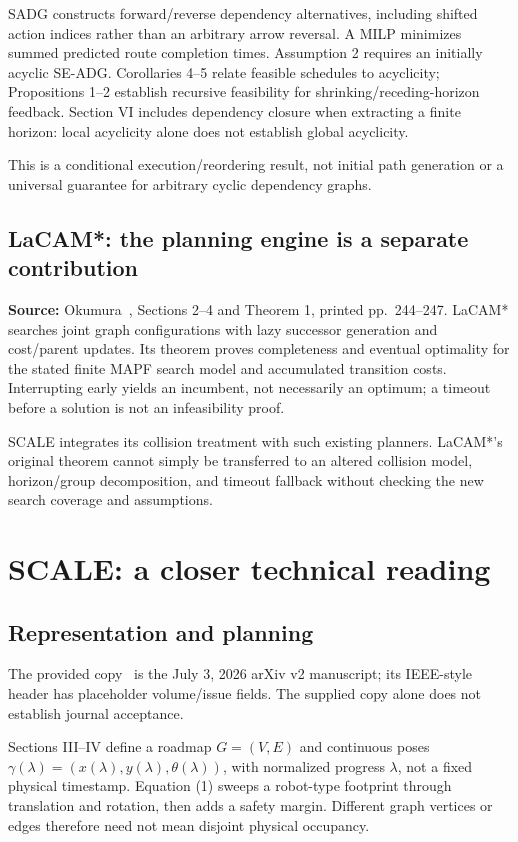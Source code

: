 \documentclass[11pt,a4paper]{article}
\begin{document}
SADG constructs forward/reverse dependency alternatives, including shifted action
indices rather than an arbitrary arrow reversal. A MILP minimizes summed predicted
route completion times. Assumption 2 requires an initially acyclic SE-ADG.
Corollaries 4--5 relate feasible schedules to acyclicity; Propositions 1--2
establish recursive feasibility for shrinking/receding-horizon feedback.
Section VI includes dependency closure when extracting a finite horizon: local
acyclicity alone does not establish global acyclicity.

This is a conditional execution/reordering result, not initial path generation
or a universal guarantee for arbitrary cyclic dependency graphs.

\subsection{LaCAM*: the planning engine is a separate contribution}
\textbf{Source:} Okumura~\cite{lacam}, Sections 2--4 and Theorem 1,
printed pp.~244--247. LaCAM* searches joint graph configurations with lazy
successor generation and cost/parent updates. Its theorem proves completeness
and eventual optimality for the stated finite MAPF search model and accumulated
transition costs. Interrupting early yields an incumbent, not necessarily an
optimum; a timeout before a solution is not an infeasibility proof.

SCALE integrates its collision treatment with such existing planners.
LaCAM*'s original theorem cannot simply be transferred to an altered collision
model, horizon/group decomposition, and timeout fallback without checking the
new search coverage and assumptions.

\section{SCALE: a closer technical reading}
\subsection{Representation and planning}
The provided copy~\cite{scale} is the July 3, 2026 arXiv v2 manuscript; its
IEEE-style header has placeholder volume/issue fields. The supplied copy alone
does not establish journal acceptance.

Sections III--IV define a roadmap $G=(V,E)$ and continuous poses
$\gamma(\lambda)=(x(\lambda),y(\lambda),\theta(\lambda))$, with normalized
progress $\lambda$, not a fixed physical timestamp. Equation (1) sweeps a
robot-type footprint through translation and rotation, then adds a safety margin.
Different graph vertices or edges therefore need not mean disjoint physical
occupancy.
\end{document}
